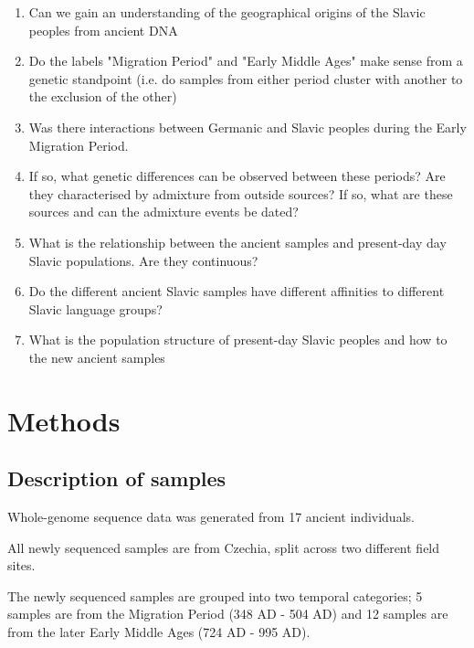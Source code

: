 \begin{enumerate}
\item Can we gain an understanding of the geographical origins of the Slavic peoples from ancient DNA
\item Do the labels "Migration Period" and "Early Middle Ages" make sense from a genetic standpoint (i.e. do samples from either period cluster with another to the exclusion of the other)
\item Was there interactions between Germanic and Slavic peoples during the Early Migration Period. 
\item If so, what genetic differences can be observed between these periods? Are they characterised by admixture from outside sources? If so, what are these sources and can the admixture events be dated?
\item What is the relationship between the ancient samples and present-day day Slavic populations. Are they continuous?
\item Do the different ancient Slavic samples have different affinities to different Slavic language groups?
\item What is the population structure of present-day Slavic peoples and how to the new ancient samples 
\end{enumerate}


\section{Methods}

\subsection{Description of samples}

Whole-genome sequence data was generated from 17 ancient individuals. 

All newly sequenced samples are from Czechia, split across two different field sites. 

The newly sequenced samples are grouped into two temporal categories; 5 samples are from the Migration Period (348 AD - 504 AD) and 12 samples are from the later Early Middle Ages (724 AD - 995 AD). 

